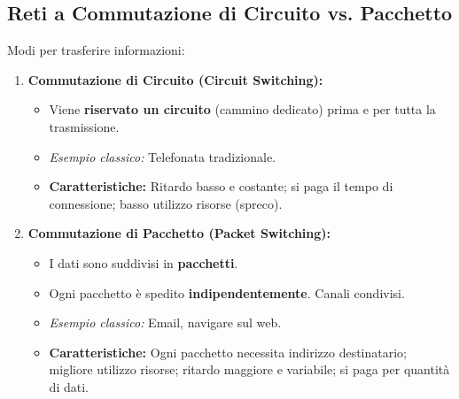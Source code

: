 \subsection{Reti a Commutazione di Circuito vs. Pacchetto}
Modi per trasferire informazioni:
\begin{enumerate}
    \item \textbf{Commutazione di Circuito (Circuit Switching):}
    \begin{itemize}
        \item Viene \textbf{riservato un circuito} (cammino dedicato) prima e per tutta la trasmissione.
        \item \textit{Esempio classico:} Telefonata tradizionale.
        \item \textbf{Caratteristiche:} Ritardo basso e costante; si paga il tempo di connessione; basso utilizzo risorse (spreco).
    \end{itemize}
    \item \textbf{Commutazione di Pacchetto (Packet Switching):}
    \begin{itemize}
        \item I dati sono suddivisi in \textbf{pacchetti}.
        \item Ogni pacchetto è spedito \textbf{indipendentemente}. Canali condivisi.
        \item \textit{Esempio classico:} Email, navigare sul web.
        \item \textbf{Caratteristiche:} Ogni pacchetto necessita indirizzo destinatario; migliore utilizzo risorse; ritardo maggiore e variabile; si paga per quantità di dati.
    \end{itemize}
\end{enumerate}

